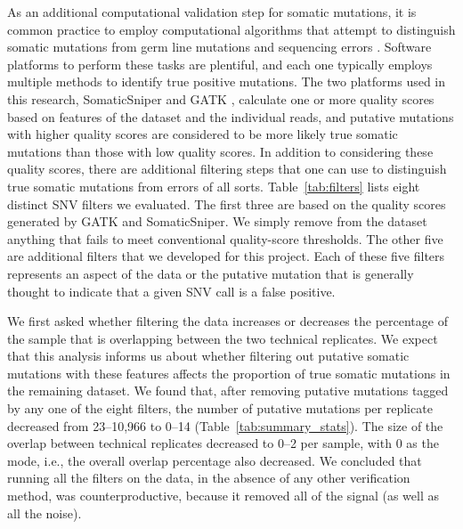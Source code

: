\documentclass[11 pt]{article} %
\begin{document}
As an additional computational validation step for somatic mutations, it is common practice to employ computational algorithms that attempt to distinguish somatic mutations from germ line mutations and sequencing errors \citep{SomaticSniper, mut_calling}. Software platforms to perform these tasks are plentiful, and each one typically employs multiple methods to identify true positive mutations. The two platforms used in this research, SomaticSniper \citep{SomaticSniper} and GATK \citep{GATK}, calculate one or more quality scores based on features of the dataset and the individual reads, and putative mutations with higher quality scores are considered to be more likely true somatic mutations than those with low quality scores. In addition to considering these quality scores, there are additional filtering steps that one can use to distinguish true somatic mutations from errors of all sorts. Table~\ref{tab:filters} lists eight distinct SNV filters we evaluated. The first three are based on the quality scores generated by GATK and SomaticSniper.  We simply remove from the dataset anything that fails to meet conventional quality-score thresholds. The other five are additional filters that we developed for this project. Each of these five filters represents an aspect of the data or the putative mutation that is generally thought to indicate that a given SNV call is a false positive.

We first asked whether filtering the data increases or decreases the percentage of the sample that is overlapping between the two technical replicates. We expect that this analysis informs us about whether filtering out putative somatic mutations with these features affects the proportion of true somatic mutations in the remaining dataset. We found that, after removing putative mutations tagged by any one of the eight filters, the number of putative mutations per replicate decreased from 23--10,966 to 0--14 (Table~\ref{tab:summary_stats}). The size of the overlap between technical replicates decreased to 0--2 per sample, with 0 as the mode, i.e., the overall overlap percentage also decreased. We concluded that running all the filters on the data, in the absence of any other verification method, was counterproductive, because it removed all of the signal (as well as all the noise). 
\end{document}
